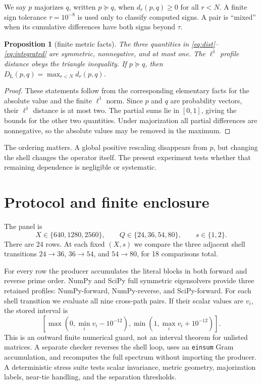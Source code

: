 \documentclass[10pt]{article}
\newtheorem{proposition}{Proposition}
\newcommand{\DL}{D_{\mathrm{L}}}
\begin{document}
We say $p$ majorizes $q$, written $p\succeq q$, when $d_r(p,q)\geq0$ for
all $r<N$.  A finite sign tolerance $\tau=10^{-8}$ is used only to classify
computed signs.  A pair is ``mixed'' when its cumulative differences have
both signs beyond $\tau$.

\begin{proposition}[finite metric facts]
The three quantities in \eqref{eq:dist}--\eqref{eq:integrated} are symmetric,
nonnegative, and at most one.  The $\ell^1$ profile distance obeys the triangle
inequality.  If $p\succeq q$, then $\DL(p,q)=\max_{r<N}d_r(p,q)$.
\end{proposition}
\begin{proof}
These statements follow from the corresponding elementary facts for the
absolute value and the finite $\ell^1$ norm.  Since $p$ and $q$ are probability
vectors, their $\ell^1$ distance is at most two.  The partial sums lie in
$[0,1]$, giving the bounds for the other two quantities.  Under
majorization all partial differences are nonnegative, so the absolute values
may be removed in the maximum.
\end{proof}

The ordering matters.  A global positive rescaling disappears from $p$, but
changing the shell changes the operator itself.  The present experiment tests
whether that remaining dependence is negligible or systematic.

\section{Protocol and finite enclosure}

The panel is
\[
 X\in\{640,1280,2560\},\qquad
 Q\in\{24,36,54,80\},\qquad s\in\{1,2\}.
\]
There are 24 rows.  At each fixed $(X,s)$ we compare the three adjacent shell
transitions $24\to36$, $36\to54$, and $54\to80$, for 18 comparisons total.

For every row the producer accumulates the literal blocks in both forward and
reverse prime order.  NumPy and SciPy full symmetric eigensolvers provide
three retained profiles: NumPy-forward, NumPy-reverse, and SciPy-forward.
For each shell transition we evaluate all nine cross-path pairs.  If their
scalar values are $v_i$, the stored interval is
\[
 [\max(0,\min_i v_i-10^{-12}),
   \min(1,\max_i v_i+10^{-12})].
\]
This is an outward finite numerical guard, not an interval theorem for
unlisted matrices.  A separate checker reverses the shell loop, uses an
\texttt{einsum} Gram accumulation, and recomputes the full spectrum without
importing the producer.  A deterministic stress suite tests scalar
invariance, metric geometry, majorization labels, near-tie handling, and the
separation thresholds.
\end{document}
